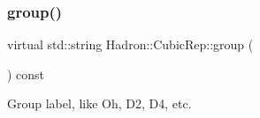 \mbox{\label{structHadron_1_1CubicRep_a0748f11ec87f387062c8e8981339a29c}} 
\subsubsection{\texorpdfstring{group()}{group()}\hspace{0.1cm}{\footnotesize\ttfamily [3/3]}}
{\footnotesize\ttfamily virtual std\+::string Hadron\+::\+Cubic\+Rep\+::group (\begin{DoxyParamCaption}{ }\end{DoxyParamCaption}) const\hspace{0.3cm}{\ttfamily [pure virtual]}}

Group label, like Oh, D2, D4, etc. 

